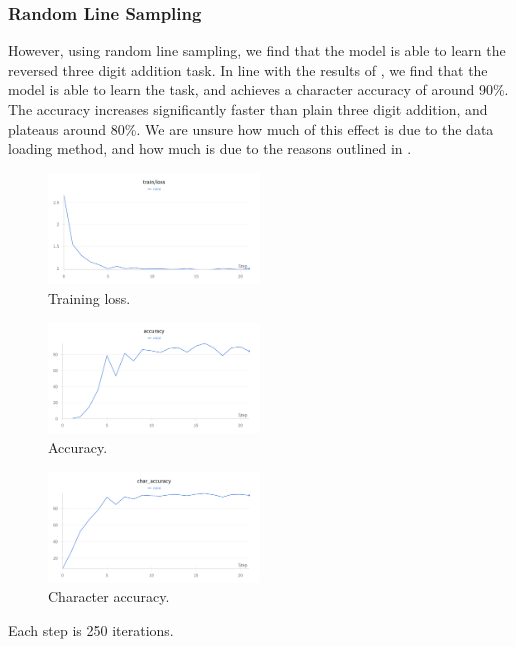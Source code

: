 \documentclass[12pt]{article}
\begin{document}
\subsubsection{Random Line Sampling}
However, using random line sampling, we find that the model is able to learn the reversed three digit addition task.
In line with the results of \cite{lee2023teaching}, we find that the model is able to learn the task, and achieves a character accuracy of around 90\%.
The accuracy increases significantly faster than plain three digit addition, and plateaus around 80\%.
We are unsure how much of this effect is due to the data loading method, and how much is due to the reasons outlined in \cite{lee2023teaching}.
\begin{figure}[h]
    \centering
    \includegraphics[width=0.5\textwidth]{figures/three-digit-reverse-line/three-digit-add-reverse-line-loss.png}
    \caption{Training loss.}
    \label{fig:reversed_three_digit_addition_line}
\end{figure}
\begin{figure}[h]
    \centering
    \includegraphics[width=0.5\textwidth]{figures/three-digit-reverse-line/three-digit-add-reverse-line-accuracy.png}
    \caption{Accuracy.}
    \label{fig:reversed_three_digit_addition_accuracy_line}
\end{figure}
\begin{figure}[h]
    \centering
    \includegraphics[width=0.5\textwidth]{figures/three-digit-reverse-line/three-digit-add-reverse-line-char-accuracy.png}
    \caption{Character accuracy.}
    \label{fig:reversed_three_digit_addition_char_accuracy_line}
\end{figure}
Each step is 250 iterations.
\end{document}
